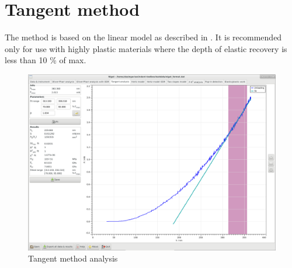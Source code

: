 
\section{Tangent method} \label{tg}
The method is based on the linear model as described in \cite{doerner1986}. It is recommended only for use with highly plastic materials where the depth of elastic
recovery is less than 10 \% of max.

\begin{figure}[ht]
  \centering
  \includegraphics[width=\textwidth]{images/screen-tangent}
  \caption{Tangent method analysis}
\end{figure}


